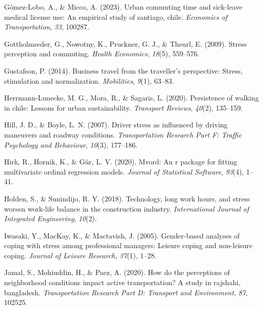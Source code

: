 \documentclass[
11pt, %
oneside, %
english, %
singlespacing, %
]{macthesis} %
\newlength{\cslhangindent}
\newenvironment{CSLReferences}[2] %
 {%
  \setlength{\parindent}{0pt}
  \ifodd #1 \everypar{\setlength{\hangindent}{\cslhangindent}}\ignorespaces\fi
  \ifnum #2 > 0
  \setlength{\parskip}{#2\baselineskip}
  \fi
 }%
 {}
\begin{document}
\begin{CSLReferences}{1}{0}
\leavevmode{}%
Gómez-Lobo, A., \& Micco, A. (2023). Urban commuting time and sick-leave medical license use: An empirical study of santiago, chile. \emph{Economics of Transportation}, \emph{33}, 100287.

\leavevmode{}%
Gottholmseder, G., Nowotny, K., Pruckner, G. J., \& Theurl, E. (2009). Stress perception and commuting. \emph{Health Economics}, \emph{18}(5), 559--576.

\leavevmode{}%
Gustafson, P. (2014). Business travel from the traveller's perspective: Stress, stimulation and normalization. \emph{Mobilities}, \emph{9}(1), 63--83.

\leavevmode{}%
Herrmann-Lunecke, M. G., Mora, R., \& Sagaris, L. (2020). Persistence of walking in chile: Lessons for urban sustainability. \emph{Transport Reviews}, \emph{40}(2), 135--159.

\leavevmode{}%
Hill, J. D., \& Boyle, L. N. (2007). Driver stress as influenced by driving maneuvers and roadway conditions. \emph{Transportation Research Part F: Traffic Psychology and Behaviour}, \emph{10}(3), 177--186.

\leavevmode{}%
Hirk, R., Hornik, K., \& Gür, L. V. (2020). Mvord: An r package for fitting multivariate ordinal regression models. \emph{Journal of Statistical Software}, \emph{93}(4), 1--41.

\leavevmode{}%
Holden, S., \& Sunindijo, R. Y. (2018). Technology, long work hours, and stress worsen work-life balance in the construction industry. \emph{International Journal of Integrated Engineering}, \emph{10}(2).

\leavevmode{}%
Iwasaki, Y., MacKay, K., \& Mactavish, J. (2005). Gender-based analyses of coping with stress among professional managers: Leisure coping and non-leisure coping. \emph{Journal of Leisure Research}, \emph{37}(1), 1--28.

\leavevmode{}%
Jamal, S., Mohiuddin, H., \& Paez, A. (2020). How do the perceptions of neighborhood conditions impact active transportation? A study in rajshahi, bangladesh. \emph{Transportation Research Part D: Transport and Environment}, \emph{87}, 102525.


\end{CSLReferences}
\end{document}
